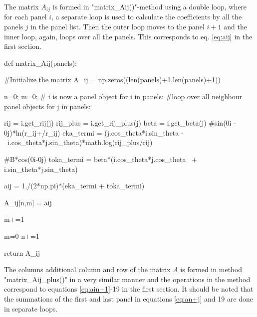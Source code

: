 \documentclass[a4paper,12pt]{article}
\begin{document}
The matrix $A_{ij}$ is formed in "matrix\_Aij()"-method using a double loop, where for each panel $i$, a separate loop is used to calculate the coefficients by all the panels $j$ in the panel list. Then the outer loop moves to the panel $i+1$ and the inner loop, again, loops over all the panels. This corresponds to eq. \ref{eq:aij} in the first section. 
\begin{python}
def matrix_Aij(panels):

        #Initialize the matrix
        A_ij = np.zeros((len(panels)+1,len(panels)+1))

        n=0; m=0;
        # i is now a panel object
        for i in panels:
                #loop over all neighbour panel objects                
                for j in panels:
                        
                        rij = i.get_rij(j)
                        rij_plus = i.get_rij_plus(j)
                        beta = i.get_beta(j)  
                        #sin(0i - 0j)*ln(r_ij+/r_ij)
                        eka_termi = (j.cos_theta*i.sin_theta - \
 			i.cos_theta*j.sin_theta)*math.log(rij_plus/rij)
                                    

                        #B*cos(0i-0j)
                        toka_termi = beta*(i.cos_theta*j.cos_theta \
                              + i.sin_theta*j.sin_theta)
                                                 
                        aij = 1./(2*np.pi)*(eka_termi + toka_termi)
                     
                        A_ij[n,m] = aij
                        
                        m+=1
                
                m=0
                n+=1
                
        return A_ij
\end{python}
The columns additional column and row of the matrix $A$ is formed in method "matrix\_Aij\_plus()" in a very similar manner and the operations in the method correspond to equations \ref{eq:ain+1}-19 in the first section. It should be noted that the summations of the first and last panel in equations \ref{eq:an+j} and 19 are done in separate loops. 
\end{document}
